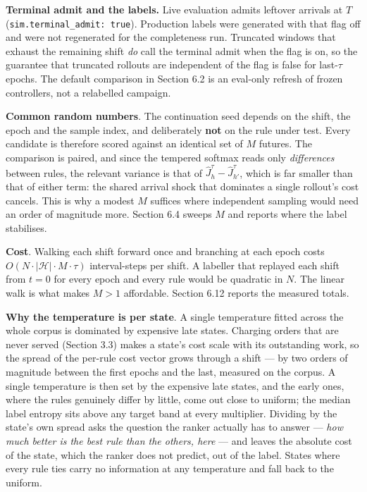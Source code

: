 \documentclass[review,3p,times]{elsarticle}
\theoremstyle{definition}
\begin{document}
\textbf{Terminal admit and the labels.} Live evaluation admits leftover
arrivals at \(T\) (\texttt{sim.terminal\_admit:\ true}). Production
labels were generated with that flag off and were not regenerated for
the completeness run. Truncated windows that exhaust the remaining shift
\emph{do} call the terminal admit when the flag is on, so the guarantee
that truncated rollouts are independent of the flag is false for
last-\(\tau\) epochs. The default comparison in Section 6.2 is an
eval-only refresh of frozen controllers, not a relabelled campaign.

\textbf{Common random numbers}. The continuation seed depends on the
shift, the epoch and the sample index, and deliberately \textbf{not} on
the rule under test. Every candidate is therefore scored against an
identical set of \(M\) futures. The comparison is paired, and since the
tempered softmax reads only \emph{differences} between rules, the
relevant variance is that of \(\hat{J}^{\tau}_h - \hat{J}^{\tau}_{h'}\),
which is far smaller than that of either term: the shared arrival shock
that dominates a single rollout's cost cancels. This is why a modest
\(M\) suffices where independent sampling would need an order of
magnitude more. Section 6.4 sweeps \(M\) and reports where the label
stabilises.

\textbf{Cost}. Walking each shift forward once and branching at each
epoch costs \(O(N \cdot |\mathcal{H}| \cdot M \cdot \tau)\)
interval-steps per shift. A labeller that replayed each shift from
\(t = 0\) for every epoch and every rule would be quadratic in \(N\).
The linear walk is what makes \(M>1\) affordable. Section 6.12 reports
the measured totals.

\textbf{Why the temperature is per state}. A single temperature fitted
across the whole corpus is dominated by expensive late states. Charging
orders that are never served (Section 3.3) makes a state's cost scale
with its outstanding work, so the spread of the per-rule cost vector
grows through a shift --- by two orders of magnitude between the first
epochs and the last, measured on the corpus. A single temperature is
then set by the expensive late states, and the early ones, where the
rules genuinely differ by little, come out close to uniform; the median
label entropy sits above any target band at every multiplier. Dividing
by the state's own spread asks the question the ranker actually has to
answer --- \emph{how much better is the best rule than the others, here}
--- and leaves the absolute cost of the state, which the ranker does not
predict, out of the label. States where every rule ties carry no
information at any temperature and fall back to the uniform.
\end{document}
